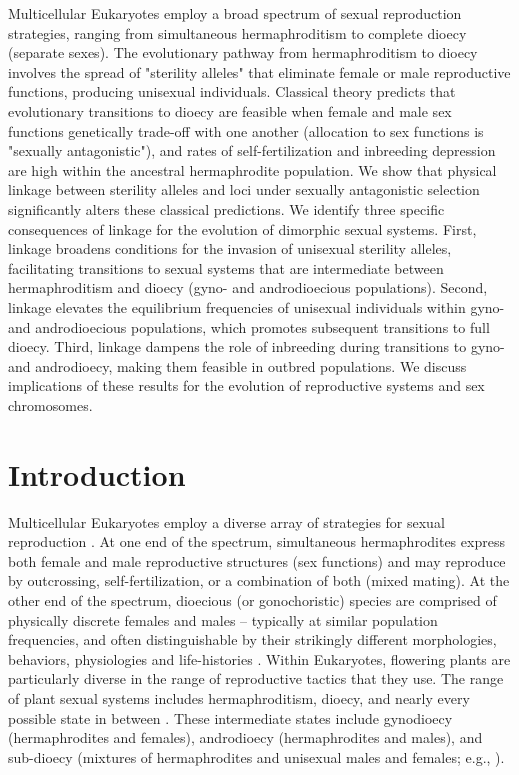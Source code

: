 \documentclass{article}
\begin{document}
\noindent{} Multicellular Eukaryotes employ a broad spectrum of sexual reproduction strategies, ranging from simultaneous hermaphroditism to complete dioecy (separate sexes). The evolutionary pathway from hermaphroditism to dioecy involves the spread of "sterility alleles" that eliminate female or male reproductive functions, producing unisexual individuals. Classical theory predicts that evolutionary transitions to dioecy are feasible when female and male sex functions genetically trade-off with one another (allocation to sex functions is "sexually antagonistic"), and rates of self-fertilization and inbreeding depression are high within the ancestral hermaphrodite population. We show that physical linkage between sterility alleles and loci under sexually antagonistic selection significantly alters these classical predictions. We identify three specific consequences of linkage for the evolution of dimorphic sexual systems. First, linkage broadens conditions for the invasion of unisexual sterility alleles, facilitating transitions to sexual systems that are intermediate between hermaphroditism and dioecy (gyno- and androdioecious populations). Second, linkage elevates the equilibrium frequencies of unisexual individuals within gyno- and androdioecious populations, which promotes subsequent transitions to full dioecy. Third, linkage dampens the role of inbreeding during transitions to gyno- and androdioecy, making them feasible in outbred populations. We discuss implications of these results for the evolution of reproductive systems and sex chromosomes.
\newpage{}


\section*{Introduction}
Multicellular Eukaryotes employ a diverse array of strategies for sexual reproduction \citep{Bachtrog2014}. At one end of the spectrum, simultaneous hermaphrodites express both female and male reproductive structures (sex functions) and may reproduce by outcrossing, self-fertilization, or a combination of both (mixed mating). At the other end of the spectrum, dioecious (or gonochoristic) species are comprised of physically discrete females and males -- typically at similar population frequencies, and often distinguishable by their strikingly different morphologies, behaviors, physiologies and life-histories \citep{Andersson1994}. Within Eukaryotes, flowering plants are particularly diverse in the range of reproductive tactics that they use. The range of plant sexual systems includes hermaphroditism, dioecy, and nearly every possible state in between \citep{Darwin1877, Westergaard1958, Bawa1980, SakaiWeller1999, Bachtrog2014}. These intermediate states include gynodioecy (hermaphrodites and females), androdioecy (hermaphrodites and males), and sub-dioecy (mixtures of hermaphrodites and unisexual males and females; e.g., \citealt{SakaiWeller1999, Renner2014}). 
\end{document}
